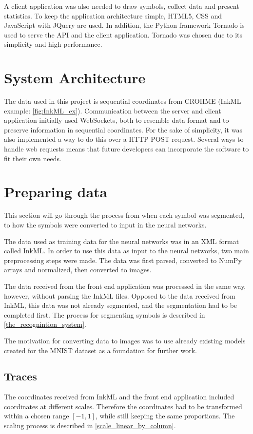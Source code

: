 A client application was also needed to draw symbols, collect data and present statistics. To keep the application architecture simple, HTML5, CSS and JavaScript with JQuery are used. In addition, the Python framework Tornado is used to serve the API and the client application. Tornado was chosen due to its simplicity and high performance.


\section{System Architecture}
The data used in this project is sequential coordinates from CROHME (InkML example: \ref{fig:InkML_ex}). Communication between the server and client application initially used WebSockets, both to resemble data format and to preserve information in sequential coordinates. For the sake of simplicity, it was also implemented a way to do this over a HTTP POST request. Several ways to handle web requests means that future developers can incorporate the software to fit their own needs.


\section{Preparing data}
This section will go through the process from when each symbol was segmented, to how the symbols were converted to input in the neural networks.

The data used as training data for the neural networks was in an XML format called InkML. In order to use this data as input to the neural networks, two main preprocessing steps were made. The data was first parsed, converted to NumPy arrays and normalized, then converted to images.

The data received from the front end application was processed in the same way, however, without parsing the InkML files. Opposed to the data received from InkML, this data was not already segmented, and the segmentation had to be completed first. The process for segmenting symbols is described in \ref{the_recognintion_system}.

The motivation for converting data to images was to use already existing models created for the MNIST dataset as a foundation for further work.

\subsection{Traces}
\label{preparing_data_traces}
The coordinates received from InkML and the front end application included coordinates at different scales. Therefore the coordinates had to be transformed within a chosen range $[-1, 1]$, while still keeping the same proportions. The scaling process is described in \ref{scale_linear_by_column}.

